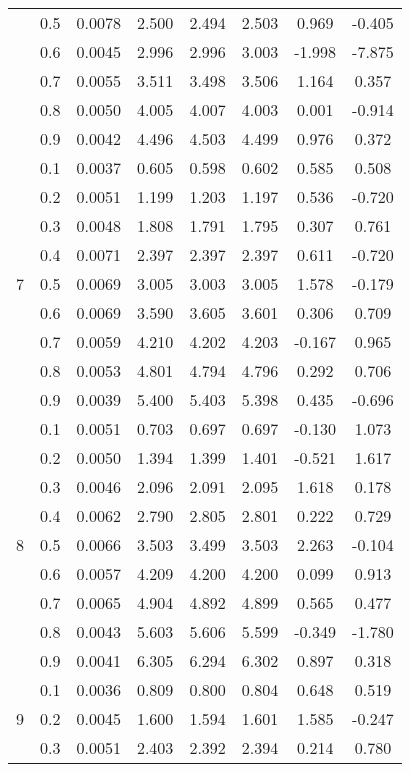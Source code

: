 \documentclass[11pt,a4paper]{report}
\begin{document}
\begin{longtable}{ | c | c || c | c | c | c | c | c | }
 & 0.5 & 0.0078 & 2.500 & 2.494 & 2.503 & 0.969 & -0.405 \\
 & 0.6 & 0.0045 & 2.996 & 2.996 & 3.003 & -1.998 & -7.875 \\
 & 0.7 & 0.0055 & 3.511 & 3.498 & 3.506 & 1.164 & 0.357 \\
 & 0.8 & 0.0050 & 4.005 & 4.007 & 4.003 & 0.001 & -0.914 \\
 & 0.9 & 0.0042 & 4.496 & 4.503 & 4.499 & 0.976 & 0.372 \\
 \hline
\multirow{9}{*}{7} & 0.1 & 0.0037 & 0.605 & 0.598 & 0.602 & 0.585 & 0.508 \\
 & 0.2 & 0.0051 & 1.199 & 1.203 & 1.197 & 0.536 & -0.720 \\
 & 0.3 & 0.0048 & 1.808 & 1.791 & 1.795 & 0.307 & 0.761 \\
 & 0.4 & 0.0071 & 2.397 & 2.397 & 2.397 & 0.611 & -0.720 \\
 & 0.5 & 0.0069 & 3.005 & 3.003 & 3.005 & 1.578 & -0.179 \\
 & 0.6 & 0.0069 & 3.590 & 3.605 & 3.601 & 0.306 & 0.709 \\
 & 0.7 & 0.0059 & 4.210 & 4.202 & 4.203 & -0.167 & 0.965 \\
 & 0.8 & 0.0053 & 4.801 & 4.794 & 4.796 & 0.292 & 0.706 \\
 & 0.9 & 0.0039 & 5.400 & 5.403 & 5.398 & 0.435 & -0.696 \\
 \hline
\multirow{9}{*}{8} & 0.1 & 0.0051 & 0.703 & 0.697 & 0.697 & -0.130 & 1.073 \\
 & 0.2 & 0.0050 & 1.394 & 1.399 & 1.401 & -0.521 & 1.617 \\
 & 0.3 & 0.0046 & 2.096 & 2.091 & 2.095 & 1.618 & 0.178 \\
 & 0.4 & 0.0062 & 2.790 & 2.805 & 2.801 & 0.222 & 0.729 \\
 & 0.5 & 0.0066 & 3.503 & 3.499 & 3.503 & 2.263 & -0.104 \\
 & 0.6 & 0.0057 & 4.209 & 4.200 & 4.200 & 0.099 & 0.913 \\
 & 0.7 & 0.0065 & 4.904 & 4.892 & 4.899 & 0.565 & 0.477 \\
 & 0.8 & 0.0043 & 5.603 & 5.606 & 5.599 & -0.349 & -1.780 \\
 & 0.9 & 0.0041 & 6.305 & 6.294 & 6.302 & 0.897 & 0.318 \\
 \hline
\multirow{9}{*}{9} & 0.1 & 0.0036 & 0.809 & 0.800 & 0.804 & 0.648 & 0.519 \\
 & 0.2 & 0.0045 & 1.600 & 1.594 & 1.601 & 1.585 & -0.247 \\
 & 0.3 & 0.0051 & 2.403 & 2.392 & 2.394 & 0.214 & 0.780 \\

\end{longtable}
\end{document}
